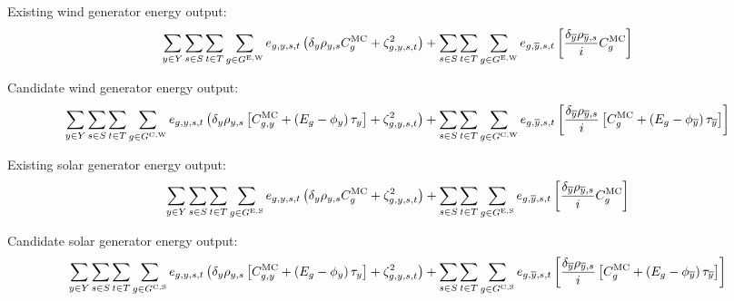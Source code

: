 \documentclass{article}
\newcommand{\sGeneratorsExistingWind}{G^{\mathrm{E,W}}}
\newcommand{\sGeneratorsExistingSolar}{G^{\mathrm{E,S}}}
\newcommand{\sGeneratorsCandidateWind}{G^{\mathrm{C,W}}}
\newcommand{\sGeneratorsCandidateSolar}{G^{\mathrm{C,S}}}
\newcommand{\sScenarios}{S}
\newcommand{\sIntervals}{T}
\newcommand{\iGenerator}{g}
\newcommand{\iYear}{y}
\newcommand{\iYearTerminal}{\overline{\iYear}}
\newcommand{\iScenario}{s}
\newcommand{\iInterval}{t}
\newcommand{\cScenarioDuration}[1][\iYear,\iScenario]{\rho_{#1}}
\newcommand{\cMarginalCost}[1][\iGenerator,\iYear]{C^{\mathrm{MC}}_{#1}}
\newcommand{\cEmissionsIntensity}[1][\iGenerator]{E_{#1}}
\newcommand{\cInterestRate}{i}
\newcommand{\cDiscountRate}[1][\iYear]{\delta_{#1}}
\newcommand{\vBaseline}[1][\iYear]{\phi_{#1}}
\newcommand{\vPermitPrice}[1][\iYear]{\tau_{#1}}
\newcommand{\vEnergy}[1][\iGenerator,\iYear,\iScenario,\iInterval]{e_{#1}}
\newcommand{\dGeneratorEnergyOutput}[1][\iGenerator,\iYear,\iScenario,\iInterval]{\zeta_{#1}^{2}}
\begin{document}
Existing wind generator energy output:
\begin{equation}
	\sumIntervals \sum\limits_{\iGenerator \in \sGeneratorsExistingWind} \vEnergy \left(\cDiscountRate\cScenarioDuration \cMarginalCost[\iGenerator] + \dGeneratorEnergyOutput \right) + \sum\limits_{\iScenario \in \sScenarios} \sum\limits_{\iInterval \in \sIntervals} \sum\limits_{\iGenerator \in \sGeneratorsExistingWind} \vEnergy[\iGenerator,\iYearTerminal,\iScenario,\iInterval] \left[ \frac{\cDiscountRate[\iYearTerminal] \cScenarioDuration[\iYearTerminal,\iScenario]}{\cInterestRate} \cMarginalCost[\iGenerator] \right]
\end{equation}

Candidate wind generator energy output:
\begin{equation}
	\sumIntervals \sum\limits_{\iGenerator \in \sGeneratorsCandidateWind} \vEnergy \left(\cDiscountRate\cScenarioDuration \left[\cMarginalCost + \left(\cEmissionsIntensity - \vBaseline\right)\vPermitPrice \right] + \dGeneratorEnergyOutput \right) + \sum\limits_{\iScenario \in \sScenarios} \sum\limits_{\iInterval \in \sIntervals} \sum\limits_{\iGenerator \in \sGeneratorsCandidateWind} \vEnergy[\iGenerator,\iYearTerminal,\iScenario,\iInterval] \left[ \frac{\cDiscountRate[\iYearTerminal] \cScenarioDuration[\iYearTerminal,\iScenario]}{\cInterestRate} \left[\cMarginalCost[\iGenerator] + \left(\cEmissionsIntensity - \vBaseline[\iYearTerminal] \right)\vPermitPrice[\iYearTerminal] \right] \right]
\end{equation}

Existing solar generator energy output:
\begin{equation}
	\sumIntervals \sum\limits_{\iGenerator \in \sGeneratorsExistingSolar} \vEnergy \left(\cDiscountRate\cScenarioDuration \cMarginalCost[\iGenerator] + \dGeneratorEnergyOutput \right) + \sum\limits_{\iScenario \in \sScenarios} \sum\limits_{\iInterval \in \sIntervals} \sum\limits_{\iGenerator \in \sGeneratorsExistingSolar} \vEnergy[\iGenerator,\iYearTerminal,\iScenario,\iInterval] \left[ \frac{\cDiscountRate[\iYearTerminal] \cScenarioDuration[\iYearTerminal,\iScenario]}{\cInterestRate} \cMarginalCost[\iGenerator] \right]
\end{equation}

Candidate solar generator energy output:
\begin{equation}
	\sumIntervals \sum\limits_{\iGenerator \in \sGeneratorsCandidateSolar} \vEnergy \left(\cDiscountRate\cScenarioDuration \left[\cMarginalCost + \left(\cEmissionsIntensity - \vBaseline\right)\vPermitPrice \right] + \dGeneratorEnergyOutput \right) + \sum\limits_{\iScenario \in \sScenarios} \sum\limits_{\iInterval \in \sIntervals} \sum\limits_{\iGenerator \in \sGeneratorsCandidateSolar} \vEnergy[\iGenerator,\iYearTerminal,\iScenario,\iInterval] \left[ \frac{\cDiscountRate[\iYearTerminal] \cScenarioDuration[\iYearTerminal,\iScenario]}{\cInterestRate} \left[\cMarginalCost[\iGenerator] + \left(\cEmissionsIntensity - \vBaseline[\iYearTerminal] \right)\vPermitPrice[\iYearTerminal] \right] \right]
\end{equation}
\end{document}
